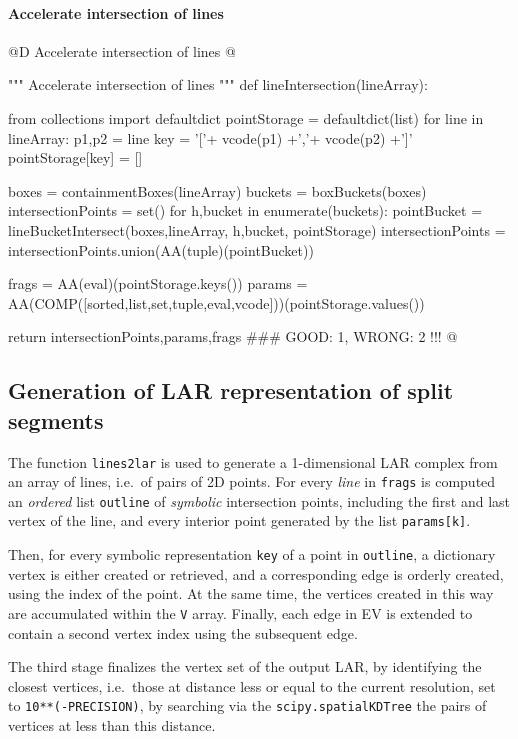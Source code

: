 \documentclass[11pt,oneside]{article}    %
\begin{document}
\paragraph{Accelerate intersection of lines}
@D Accelerate intersection of lines
@{""" Accelerate intersection of lines """
def lineIntersection(lineArray):

    from collections import defaultdict
    pointStorage = defaultdict(list)
    for line in lineArray:
        p1,p2 = line
        key = '['+ vcode(p1) +','+ vcode(p2) +']'
        pointStorage[key] = []

    boxes = containmentBoxes(lineArray)
    buckets = boxBuckets(boxes)
    intersectionPoints = set()
    for h,bucket in enumerate(buckets):
        pointBucket = lineBucketIntersect(boxes,lineArray, h,bucket, pointStorage)
        intersectionPoints = intersectionPoints.union(AA(tuple)(pointBucket))

    frags = AA(eval)(pointStorage.keys())
    params = AA(COMP([sorted,list,set,tuple,eval,vcode]))(pointStorage.values())
        
    return intersectionPoints,params,frags  ### GOOD: 1, WRONG: 2 !!!
@}


\subsection{Generation of LAR representation of split segments}
The function \texttt{lines2lar} is used to generate a 1-dimensional LAR complex from
an array of lines, i.e.~of pairs of 2D points. For every \emph{line} in \texttt{frags}
is computed an \emph{ordered} list \texttt{outline} of \emph{symbolic} intersection points, including 
the first and last vertex of the line, and every interior point generated by the list \texttt{params[k]}.

Then, for every symbolic representation \texttt{key} of a point in \texttt{outline}, a 
dictionary vertex is either created or retrieved, and a corresponding edge is orderly created, using the index of the point.
At the same time, the vertices created in this way are accumulated within the \texttt{V} array.
Finally, each edge in EV is extended to contain a second vertex index using the subsequent edge.  

The third stage finalizes the vertex set of the output LAR, by identifying the closest vertices, i.e.~those at distance
less or equal to the current resolution, set to \texttt{10**(-PRECISION)}, by searching via the \texttt{scipy.spatialKDTree} the pairs of vertices at less than this distance.
\end{document}
